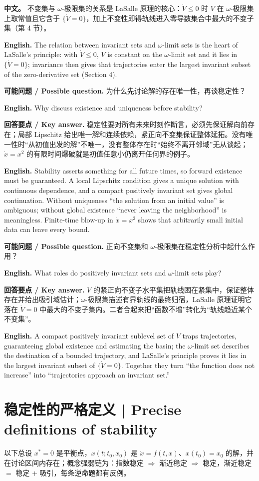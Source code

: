 \documentclass[UTF8,11pt,a4paper]{ctexart}
\newcommand{\EN}[1]{\par\noindent\textbf{English.} #1\par}
\newcommand{\ASK}[4]{\begin{samepage}\par\noindent\textbf{可能问题 / Possible question.} #1\par\EN{#2}\noindent\textbf{回答要点 / Key answer.} #3\par\EN{#4}\smallskip\end{samepage}}
\newcommand{\APS}[2]{\par\noindent\textbf{中文。} #1\par\noindent\textbf{English.} #2\par}
\begin{document}
\APS{不变集与 $\omega$-极限集的关系是 LaSalle 原理的核心：$\dot V\le0$ 时 $V$ 在 $\omega$-极限集上取常值且它含于 $\{\dot V=0\}$，加上不变性即得轨线进入零导数集合中最大的不变子集（第 4 节）。}{The relation between invariant sets and $\omega$-limit sets is the heart of LaSalle's principle: with $\dot V\le0$, $V$ is constant on the $\omega$-limit set and it lies in $\{\dot V=0\}$; invariance then gives that trajectories enter the largest invariant subset of the zero-derivative set (Section 4).}

\ASK{为什么先讨论解的存在唯一性，再谈稳定性？}{Why discuss existence and uniqueness before stability?}{稳定性要对所有未来时刻作断言，必须先保证解向前存在；局部 Lipschitz 给出唯一解和连续依赖，紧正向不变集保证整体延拓。没有唯一性时“从初值出发的解”不唯一，没有整体存在时“始终不离开邻域”无从谈起；$\dot x=x^2$ 的有限时间爆破就是初值任意小仍离开任何界的例子。}{Stability asserts something for all future times, so forward existence must be guaranteed. A local Lipschitz condition gives a unique solution with continuous dependence, and a compact positively invariant set gives global continuation. Without uniqueness “the solution from an initial value” is ambiguous; without global existence “never leaving the neighborhood” is meaningless. Finite-time blow-up in $\dot x=x^2$ shows that arbitrarily small initial data can leave every bound.}

\ASK{正向不变集和 $\omega$-极限集在稳定性分析中起什么作用？}{What roles do positively invariant sets and $\omega$-limit sets play?}{$V$ 的紧正向不变子水平集把轨线困在紧集中，保证整体存在并给出吸引域估计；$\omega$-极限集描述有界轨线的最终归宿，LaSalle 原理证明它落在 $\dot V=0$ 中最大的不变子集内。二者合起来把“函数不增”转化为“轨线趋近某个不变集”。}{A compact positively invariant sublevel set of $V$ traps trajectories, guaranteeing global existence and estimating the basin; the $\omega$-limit set describes the destination of a bounded trajectory, and LaSalle's principle proves it lies in the largest invariant subset of $\{\dot V=0\}$. Together they turn “the function does not increase” into “trajectories approach an invariant set.”}

\section{稳定性的严格定义 | Precise definitions of stability}
以下总设 $x^*=0$ 是平衡点，$x(t;t_0,x_0)$ 是 $\dot x=f(t,x)$、$x(t_0)=x_0$ 的解，并在讨论区间内存在；概念强弱链为：指数稳定 $\Rightarrow$ 渐近稳定 $\Rightarrow$ 稳定，渐近稳定 $=$ 稳定 $+$ 吸引，每条逆命题都有反例。
\end{document}
